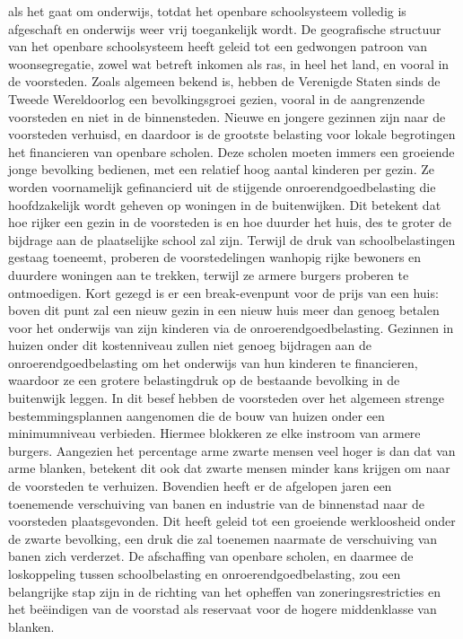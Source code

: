 \documentclass[
  a5paper,
  smalldemyvopaper,10pt,twoside,onecolumn,openright,extrafontsizes,hidelinks]{memoir}
\begin{document}
als het gaat om onderwijs, totdat het openbare schoolsysteem volledig is
afgeschaft en onderwijs weer vrij toegankelijk wordt. De geografische
structuur van het openbare schoolsysteem heeft geleid tot een gedwongen
patroon van woonsegregatie, zowel wat betreft inkomen als ras, in heel
het land, en vooral in de voorsteden. Zoals algemeen bekend is, hebben
de Verenigde Staten sinds de Tweede Wereldoorlog een bevolkingsgroei
gezien, vooral in de aangrenzende voorsteden en niet in de binnensteden.
Nieuwe en jongere gezinnen zijn naar de voorsteden verhuisd, en daardoor
is de grootste belasting voor lokale begrotingen het financieren van
openbare scholen. Deze scholen moeten immers een groeiende jonge
bevolking bedienen, met een relatief hoog aantal kinderen per gezin. Ze
worden voornamelijk gefinancierd uit de stijgende onroerendgoedbelasting
die hoofdzakelijk wordt geheven op woningen in de buitenwijken. Dit
betekent dat hoe rijker een gezin in de voorsteden is en hoe duurder het
huis, des te groter de bijdrage aan de plaatselijke school zal zijn.
Terwijl de druk van schoolbelastingen gestaag toeneemt, proberen de
voorstedelingen wanhopig rijke bewoners en duurdere woningen aan te
trekken, terwijl ze armere burgers proberen te ontmoedigen. Kort gezegd
is er een break-evenpunt voor de prijs van een huis: boven dit punt zal
een nieuw gezin in een nieuw huis meer dan genoeg betalen voor het
onderwijs van zijn kinderen via de onroerendgoedbelasting. Gezinnen in
huizen onder dit kostenniveau zullen niet genoeg bijdragen aan de
onroerendgoedbelasting om het onderwijs van hun kinderen te financieren,
waardoor ze een grotere belastingdruk op de bestaande bevolking in de
buitenwijk leggen. In dit besef hebben de voorsteden over het algemeen
strenge bestemmingsplannen aangenomen die de bouw van huizen onder een
minimumniveau verbieden. Hiermee blokkeren ze elke instroom van armere
burgers. Aangezien het percentage arme zwarte mensen veel hoger is dan
dat van arme blanken, betekent dit ook dat zwarte mensen minder kans
krijgen om naar de voorsteden te verhuizen. Bovendien heeft er de
afgelopen jaren een toenemende verschuiving van banen en industrie van
de binnenstad naar de voorsteden plaatsgevonden. Dit heeft geleid tot
een groeiende werkloosheid onder de zwarte bevolking, een druk die zal
toenemen naarmate de verschuiving van banen zich verderzet. De
afschaffing van openbare scholen, en daarmee de loskoppeling tussen
schoolbelasting en onroerendgoedbelasting, zou een belangrijke stap zijn
in de richting van het opheffen van zoneringsrestricties en het
beëindigen van de voorstad als reservaat voor de hogere middenklasse van
blanken.
\end{document}
